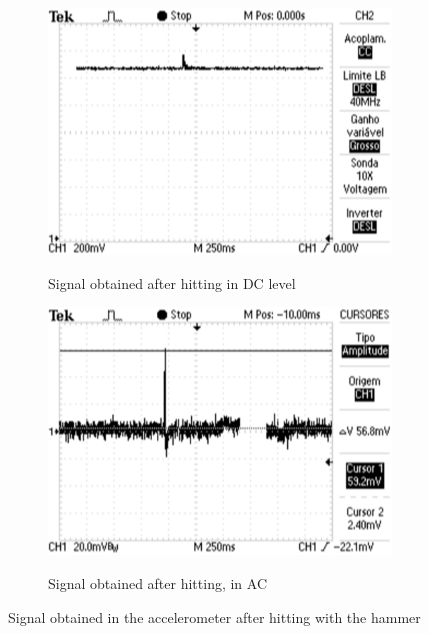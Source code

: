 \begin{figure}[]
    \centering
    \begin{subfigure}{0.45\textwidth}
        \centering
        \includegraphics[width=\linewidth]{Chapters/4CHP/Figures/maxAccNDC.eps}
        \caption{Signal obtained after hitting in DC level}{}
        \label{subfig:maxAccNDC}
    \end{subfigure}
    \begin{subfigure}{0.45\textwidth}
        \centering
        \includegraphics[width=\linewidth]{Chapters/4CHP/Figures/maxAccN.eps}
        \caption{Signal obtained after hitting, in AC}{}
        \label{subfig:maxAccN}
    \end{subfigure}
    \caption{Signal obtained in the accelerometer after hitting with the hammer}
    \label{fig:NampSigAcc}
\end{figure}

